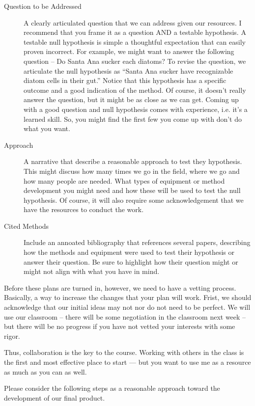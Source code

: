 \documentclass{tufte-handout}\usepackage[]{graphicx}\usepackage[]{color}
\begin{document}
\begin{description}
  \item[Question to be Addressed] A clearly articulated question that we can address given our resources. I recommend that you frame it as a question AND a testable hypothesis. A testable null hypothesis is simple a thoughtful expectation that can easily proven incorrect. For example, we might want to answer the following question -- Do Santa Ana sucker each diatoms?  To revise the question, we articulate the null hypothesis as ``Santa Ana sucker have recognizable diatom cells in their gut.'' Notice that this hypothesis has a specific outcome and a good indication of the method. Of course, it doesn't really answer the question, but it might be as close as we can get. Coming up with a good question and null hypothesis comes with experience, i.e. it's a learned skill. So, you might find the first few you come up with don't do what you want.   
  \item[Approach] A narrative that describe a reasonable approach to test they hypothesis. This might discuss how many times we go in the field, where we go and how many people are needed. What types of equipment or method development you might need and how these will be used to test the null hypothesis. Of course, it will also require some acknowledgement that we have the resources to conduct the work. 
  \item[Cited Methods] Include an annoated bibliography that references several papers, describing how the methods and equipment were used to test their hypothesis or answer their question. Be sure to highlight how their question might or might not align with what you have in mind.
\end{description}

Before these plans are turned in, however, we need to have a vetting process. Basically, a way to increase the changes that your plan will work. Frist, we should acknowledge that our initial ideas may not nor do not need to be perfect. We will use our classroom -- there will be some negotiation in the classroom next week -- but there will be no progress if you have not vetted your interests with some rigor.

Thus, collaboration is the key to the course. Working with others in the class is the first and most effective place to start --- but you want to use me as a resource as much as you can as well. 

Please consider the following steps as a reasonable approach toward the development of our final product. 
\end{document}
